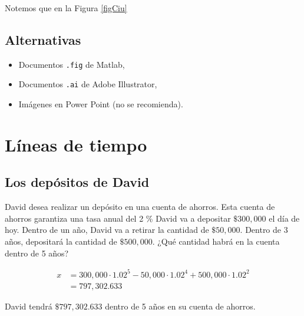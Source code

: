 \documentclass[letterpaper,12pt,oneside]{book}
\begin{document}
Notemos que en la Figura \ref{figCiu} 

\section{Alternativas}
\begin{itemize}
\item Documentos \verb|.fig| de Matlab,
\item Documentos \verb|.ai| de Adobe Illustrator,
\item Imágenes en Power Point (no se recomienda).
\end{itemize}

\chapter{Líneas de tiempo}

\section{Los depósitos de David}
\noindent David desea realizar un depósito en una cuenta de ahorros. Esta cuenta de ahorros garantiza una tasa anual del 2 \% David va a depositar $\$300,000$ el día de hoy. Dentro de un año, David va a retirar la cantidad de $\$ 50,000$. Dentro de 3 años, depositará la cantidad de $\$500,000$. ¿Qué cantidad habrá en la cuenta dentro de 5 años? 

\begin{figure}[htp]
\centering
{}	
\end{figure}

\begin{align*}
x &= 300,000 \cdot 1.02^{5}-50,000 \cdot 1.02^{4}+500,000 \cdot 1.02^{2}\\
  &= 797,302.633
\end{align*}

\noindent David tendrá $\$797,302.633$ dentro de 5 años en su cuenta de ahorros.\vspace{\baselineskip}
\end{document}
